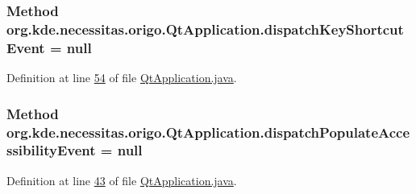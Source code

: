 \hypertarget{classorg_1_1kde_1_1necessitas_1_1origo_1_1_qt_application_a4a5361e0ccac0f7a8890dd2fed6f6d20}{
\subsubsection[{dispatch\-Key\-Shortcut\-Event}]{\setlength{\rightskip}{0pt plus 5cm}Method org.\-kde.\-necessitas.\-origo.\-Qt\-Application.\-dispatch\-Key\-Shortcut\-Event = null\hspace{0.3cm}{\ttfamily [static]}}}\label{d0/da0/classorg_1_1kde_1_1necessitas_1_1origo_1_1_qt_application_a4a5361e0ccac0f7a8890dd2fed6f6d20}


Definition at line \hyperlink{_qt_application_8java_source_l00054}{54} of file \hyperlink{_qt_application_8java_source}{Qt\-Application.\-java}.

\hypertarget{classorg_1_1kde_1_1necessitas_1_1origo_1_1_qt_application_a6efc44f694101237803c49b4a59387fc}{
\subsubsection[{dispatch\-Populate\-Accessibility\-Event}]{\setlength{\rightskip}{0pt plus 5cm}Method org.\-kde.\-necessitas.\-origo.\-Qt\-Application.\-dispatch\-Populate\-Accessibility\-Event = null\hspace{0.3cm}{\ttfamily [static]}}}\label{d0/da0/classorg_1_1kde_1_1necessitas_1_1origo_1_1_qt_application_a6efc44f694101237803c49b4a59387fc}


Definition at line \hyperlink{_qt_application_8java_source_l00043}{43} of file \hyperlink{_qt_application_8java_source}{Qt\-Application.\-java}.

